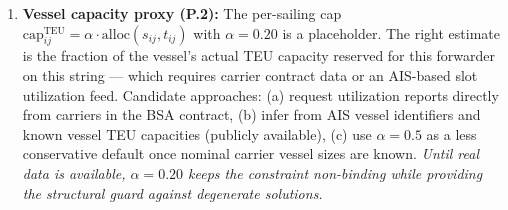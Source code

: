 \documentclass[11pt,a4paper]{article}
\theoremstyle{definition}
\begin{document}
\begin{enumerate}
  \item \textbf{Vessel capacity proxy (P.2):} The per-sailing cap $\text{cap}_{ij}^{\text{TEU}}
        = \alpha \cdot \text{alloc}(s_{ij}, t_{ij})$ with $\alpha = 0.20$ is a placeholder.
        The right estimate is the fraction of the vessel's actual TEU capacity reserved for
        this forwarder on this string --- which requires carrier contract data or an AIS-based
        slot utilization feed. Candidate approaches: (a) request utilization reports directly
        from carriers in the BSA contract, (b) infer from AIS vessel identifiers and
        known vessel TEU capacities (publicly available), (c) use $\alpha = 0.5$ as a
        less conservative default once nominal carrier vessel sizes are known.
        \textit{Until real data is available, $\alpha = 0.20$ keeps the constraint non-binding
        while providing the structural guard against degenerate solutions.}
\end{enumerate}
\end{document}

